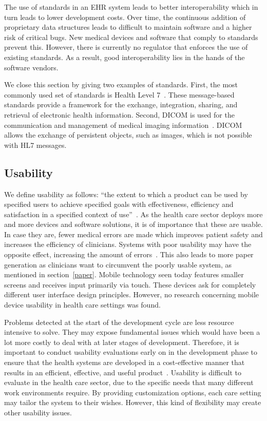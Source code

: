         The use of standards in an EHR system leads to better interoperability which in turn leads to lower development costs. Over time, the continuous addition of proprietary data structures leads to difficult to maintain software and a higher risk of critical bugs. New medical devices and software that comply to standards prevent this. However, there is currently no regulator that enforces the use of existing standards. As a result, good interoperability lies in the hands of the software vendors.

        We close this section by giving two examples of standards. First, the most commonly used set of standards is Health Level 7~\cite{HL7}. These message-based standards provide a framework for the exchange, integration, sharing, and retrieval of electronic health information. Second, DICOM is used for the communication and management of medical imaging information~\cite{Mildenberger2002}. DICOM allows the exchange of persistent objects, such as images, which is not possible with HL7 messages.

    \subsection{Usability}\label{usability}

    We define usability as follows: ``the extent to which a product can be used by specified users to achieve specified goals with effectiveness, efficiency and satisfaction in a specified context of use''~\cite{Bevan2001}. As the health care sector deploys more and more devices and software solutions, it is of importance that these are usable. In case they are, fewer medical errors are made which improves patient safety and increases the efficiency of clinicians. Systems with poor usability may have the opposite effect, increasing the amount of errors~\cite{Koppel2005}. This also leads to more paper generation as clinicians want to circumvent the poorly usable system, as mentioned in section~\ref{paper}. Mobile technology seen today features smaller screens and receives input primarily via touch. These devices ask for completely different user interface design principles. However, no research concerning mobile device usability in health care settings was found.

    Problems detected at the start of the development cycle are less resource intensive to solve. They may expose fundamental issues which would have been a lot more costly to deal with at later stages of development. Therefore, it is important to conduct usability evaluations early on in the development phase to ensure that the health systems are developed in a cost-effective manner that results in an efficient, effective, and useful product~\cite{Edwards2008}. Usability is difficult to evaluate in the health care sector, due to the specific needs that many different work environments require. By providing customization options, each care setting may tailor the system to their wishes. However, this kind of flexibility may create other usability issues.

